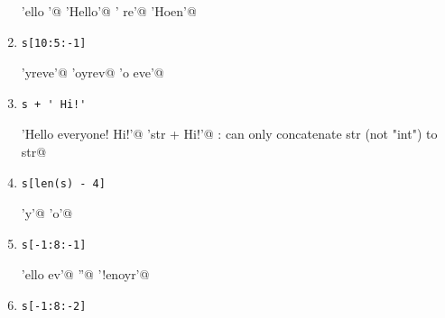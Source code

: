 \begin{enumerate}
\begin{choices}
    \choice \verb@'ello '@
    \choice \verb@'Hello'@
    \choice \verb@' re'@
    \choice \verb@'Hoen'@
\end{choices}


\item 
\begin{Verbatim}
s[10:5:-1]
\end{Verbatim}


\begin{choices}
    \choice \verb@'yreve'@
    \choice \verb@'oyrev@
    \choice \verb@'o eve'@
    \choice \verb@IndexError@
\end{choices}



\item 
\begin{Verbatim}
s + ' Hi!'
\end{Verbatim}

\begin{choices}
    \choice \verb@'Hello everyone! Hi!'@
    \choice \verb@'str +  Hi!'@
    \choice \verb@TypeError: can only concatenate str (not "int") to str@
    \choice \verb@False@
\end{choices}


\item 
\begin{Verbatim}
s[len(s) - 4]
\end{Verbatim}

\begin{choices}
    \choice \verb@'y'@
    \choice \verb@'o'@
    \choice \verb@TypeError@
    \choice \verb@IndexError@
\end{choices}


\item 
\begin{Verbatim}
s[-1:8:-1]
\end{Verbatim}

\begin{choices}
    \choice \verb@'ello ev'@
    \choice \verb@''@
    \choice \verb@'!enoyr'@
    \choice \verb@IndexError@
\end{choices}


\item 
\begin{Verbatim}
s[-1:8:-2]
\end{Verbatim}


\end{enumerate}
